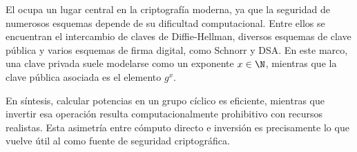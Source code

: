 El \DLP ocupa un lugar central en la criptografía moderna, ya que la seguridad de numerosos esquemas depende de su dificultad computacional. Entre ellos se encuentran el intercambio de claves de Diffie-Hellman, diversos esquemas de clave pública y varios esquemas de firma digital, como Schnorr y DSA. En este marco, una clave privada suele modelarse como un exponente $x \in \N$, mientras que la clave pública asociada es el elemento $g^x$.

En síntesis, calcular potencias en un grupo cíclico es eficiente, mientras que invertir esa operación resulta computacionalmente prohibitivo con recursos realistas. Esta asimetría entre cómputo directo e inversión es precisamente lo que vuelve útil al \DLP como fuente de seguridad criptográfica.

